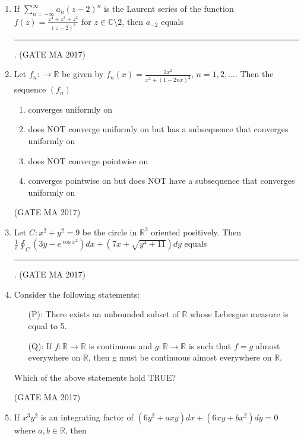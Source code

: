 \documentclass[journal,12pt,onecolumn]{IEEEtran}
\theoremstyle{remark}
\begin{document}
\begin{enumerate}
\item
If $\sum_{n=-\infty}^{\infty} a_n(z-2)^n$ is the Laurent series of the function $f(z) = \frac{z^4+z^3+z^2}{(z-2)^3}$ for $z \in \mathbb{C} \setminus {2}$, then $a_{-2}$ equals \rule{1.5cm}{0.4pt}.
\hfill (GATE MA 2017)
\item
Let $f_n: \to \mathbb{R}$ be given by $f_n(x) = \frac{2x^2}{x^2 + (1-2nx)^2}$, $n=1,2,\dots$. Then the sequence $(f_n)$
\begin{enumerate}
\item converges uniformly on
\item does NOT converge uniformly on but has a subsequence that converges uniformly on
\item does NOT converge pointwise on
\item converges pointwise on but does NOT have a subsequence that converges uniformly on
\end{enumerate}
\hfill (GATE MA 2017)
\item
Let $C: x^2+y^2=9$ be the circle in $\mathbb{R}^2$ oriented positively. Then $\frac{1}{\pi} \oint_C (3y - e^{\cos x^2})dx + (7x + \sqrt{y^4+11})dy$ equals \rule{1.5cm}{0.4pt}.
\hfill (GATE MA 2017)
\item
Consider the following statements:
\begin{itemize}
\item[(P):] There exists an unbounded subset of $\mathbb{R}$ whose Lebesgue measure is equal to 5.
\item[(Q):] If $f:\mathbb{R} \to \mathbb{R}$ is continuous and $g:\mathbb{R} \to \mathbb{R}$ is such that $f=g$ almost everywhere on $\mathbb{R}$, then g must be continuous almost everywhere on $\mathbb{R}$.
\end{itemize}
Which of the above statements hold TRUE?
\begin{enumerate}
\end{enumerate}
\hfill (GATE MA 2017)
\item
If $x^3y^2$ is an integrating factor of $(6y^2 + axy)dx + (6xy + bx^2)dy = 0$ where $a, b \in \mathbb{R}$, then
\begin{enumerate}
\begin{multicols}{2}

\end{multicols}
\end{enumerate}
\end{enumerate}
\end{document}
